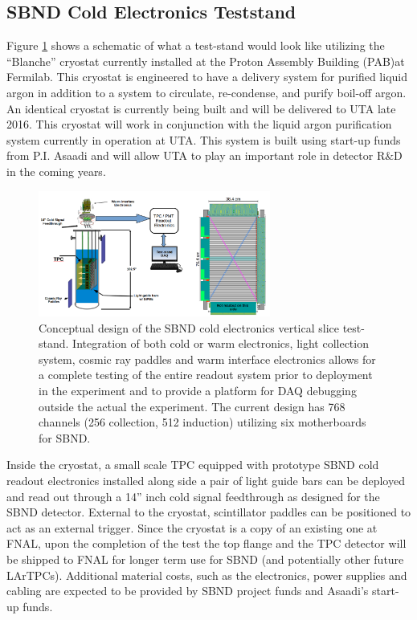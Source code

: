 \subsection{SBND Cold Electronics Teststand}\label{sec:SBNDTeststand}
Figure \ref{fig:teststand} shows a schematic of what a test-stand would look like utilizing the ``Blanche'' cryostat currently installed at the Proton Assembly Building (PAB)at Fermilab. This cryostat is engineered to have a delivery system for purified liquid argon in addition to a system to circulate, re-condense, and purify boil-off argon. An identical cryostat is currently being built and will be delivered to UTA late 2016. This cryostat will work in conjunction with the liquid argon purification system currently in operation at UTA. This system is built using start-up funds from P.I. Asaadi and will allow UTA to play an important role in detector R$\&$D in the coming years. 

\begin{figure}[htb]
\centering
\includegraphics[width=0.68\textwidth]{images/teststand3.png}
\caption[]{Conceptual design of the SBND cold electronics vertical slice test-stand. Integration of both cold or warm electronics, light collection system, cosmic ray paddles and warm interface electronics allows for a complete testing of the entire readout system prior to deployment in the experiment and to provide a platform for DAQ debugging outside the actual the experiment. The current design has 768 channels (256 collection, 512 induction) utilizing six motherboards for SBND.}
\label{fig:teststand}
\end{figure} 

Inside the cryostat, a small scale TPC equipped with prototype SBND cold readout electronics installed along side a pair of light guide bars can be deployed and read out through a 14'' inch cold signal feedthrough as designed for the SBND detector. External to the cryostat, scintillator paddles can be positioned to act as an external trigger. Since the cryostat is a copy of an existing one at FNAL, upon the completion of the test the top flange and the TPC detector will be shipped to FNAL for longer term use for SBND (and potentially other future LArTPCs). Additional material costs, such as the electronics, power supplies and cabling are expected to be provided by SBND project funds and Asaadi's start-up funds.

